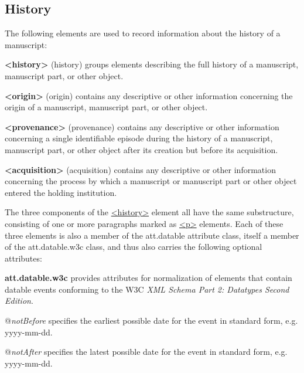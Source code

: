 \subsection[{History}]{History}\label{mshy}\par
The following elements are used to record information about the history of a manuscript: 
\begin{sansreflist}
  
\item [\textbf{<history>}] (history) groups elements describing the full history of a manuscript, manuscript part, or other object.
\item [\textbf{<origin>}] (origin) contains any descriptive or other information concerning the origin of a manuscript, manuscript part, or other object.
\item [\textbf{<provenance>}] (provenance) contains any descriptive or other information concerning a single identifiable episode during the history of a manuscript, manuscript part, or other object after its creation but before its acquisition.
\item [\textbf{<acquisition>}] (acquisition) contains any descriptive or other information concerning the process by which a manuscript or manuscript part or other object entered the holding institution.
\end{sansreflist}
\par
The three components of the \hyperref[TEI.history]{<history>} element all have the same substructure, consisting of one or more paragraphs marked as \hyperref[TEI.p]{<p>} elements. Each of these three elements is also a member of the \textsf{att.datable} attribute class, itself a member of the \textsf{att.datable.w3c} class, and thus also carries the following optional attributes: 
\begin{sansreflist}
  
\item [\textbf{att.datable.w3c}] provides attributes for normalization of elements that contain datable events conforming to the W3C \textit{XML Schema Part 2: Datatypes Second Edition}.\hfil\\[-10pt]\begin{sansreflist}
    \item[@{\itshape notBefore}]
  specifies the earliest possible date for the event in standard form, e.g. yyyy-mm-dd.
    \item[@{\itshape notAfter}]
  specifies the latest possible date for the event in standard form, e.g. yyyy-mm-dd.
\end{sansreflist}  
\end{sansreflist}

